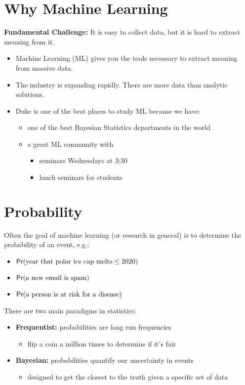 \documentclass[twoside]{article}
\def\Pr{\textsf{Pr}} %
\def\tn#1{\textnormal{#1}} %
\begin{document}
\section*{Why Machine Learning}
{\bf Fundamental Challenge:} It is easy to collect data, but it is hard to extract meaning from it.
\begin{itemize}
  \item Machine Learning (ML) gives you the tools necessary to extract meaning from massive data. 
  \item The industry is expanding rapidly. There are more data than analytic solutions. 
  \item Duke is one of the best places to study ML because we have:
  \begin{itemize}
    \item one of the best Bayesian Statistics departments in the world
    \item a great ML community with
    \begin{itemize}
      \item seminars Wednesdays at 3:30
      \item lunch seminars for students
    \end{itemize}
  \end{itemize}
\end{itemize}


\section*{Probability}
Often the goal of machine learning (or research in general) is to determine the probability of an event, e.g.:
\begin{itemize}
\item $\Pr(\tn{year that polar ice cap melts} \leq 2020)$
\item $\Pr(\tn{a new email is spam})$
\item $\Pr(\tn{a person is at risk for a disease})$
\end{itemize}

There are two main paradigms in statistics:
\begin{itemize}
  \item {\bf Frequentist:} probabilities are long run frequencies
  \begin{itemize}
    \item flip a coin a million times to determine if it's fair
  \end{itemize}
  \item {\bf Bayesian:} probabilities quantify our uncertainty in events
  \begin{itemize}
    \item designed to get the closest to the truth given a specific set of data
  \end{itemize}
\end{itemize}
\end{document}
